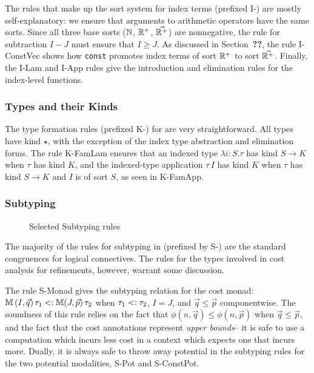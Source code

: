 The rules that make up the sort system for index terms (prefixed I-) are mostly self-explanatory: we ensure that arguments to arithmetic operators have the same sorts.
Since all three base sorts ($\mathbb{N}$, $\mathbb{R}^+$, $\vec{\mathbb{R}^+}$) are nonnegative, the rule for subtraction $I - J$ must ensure that $I \geq J$. As discussed in Section~\textbf{??}, the rule I-ConstVec shows how \texttt{const} promotes index terms of sort $\mathbb{R}^+$ to sort $\vec{\mathbb{R}^+}$. Finally, the I-Lam and I-App rules give the introduction and elimination rules for the index-level functions.

\subsubsection{Types and their Kinds}
The type formation rules (prefixed K-) for \dlambdaamor are very straightforward. All types have kind $\star$, with the exception of the index type abstraction and elimination forms. The rule K-FamLam ensures that an indexed type $\lambda i : S. \tau$ has kind $S \to K$ when $\tau$ has kind $K$, and the indexed-type application $\tau \, I$ has kind $K$ when $\tau$ has kind $S \to K$ and $I$ is of sort $S$, as seen in K-FamApp.

\subsubsection{Subtyping}
\begin{figure}

\label{fig:dlambdaamor-selected-subty-rules}
\caption{Selected Subtyping rules}
\end{figure}
The majority of the rules for subtyping in \dlambdaamor (prefixed by S-) are the standard congruences for logical connectives. The rules for the types involved in cost analysis for refinements, however, warrant some discussion.

The rule S-Monad gives the subtyping relation for the cost monad: $\mathbb{M} \, (I,\vec{q}) \, \tau_1 <: \mathbb{M} (J,\vec{p}) \,\tau_2$ when $\tau_1 <: \tau_2$, $I = J$, and $\vec{q} \leq \vec{p}$ componentwise. The soundness of this rule relies on the fact that $\phi(n,\vec{q}) \leq \phi(n,\vec{p})$ when $\vec{q} \leq \vec{p}$, and the fact that the cost annotations represent \textit{upper bounds}-- it is safe to use a computation which incurs less cost in a context which expects one that incurs more. Dually, it is always safe to throw away potential in the subtyping rules for the two potential modalities, S-Pot and S-ConstPot.

